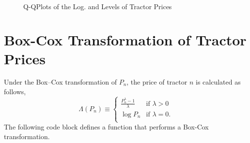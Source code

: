 \documentclass[11pt]{book}
\begin{document}
\begin{figure}[!ht]
\hfill
{}

\caption{Q-QPlots of the Log. and Levels of Tractor Prices}
\label{fig:qq_prices}
\end{figure}





\pagebreak
\section{Box-Cox Transformation of Tractor Prices}

Under the Box--Cox transformation of $P_n$, the price of tractor $n$
is calculated as follows,
$$\Lambda(P_n)\equiv
  \begin{cases}
	\frac{P_n^\lambda-1}{\lambda}	& \textrm{if } \lambda > 0 \\
           \log P_n                     			& \textrm{if } \lambda = 0.\\
  \end{cases}
$$
The following code block defines a function that performs a
Box-Cox transformation.
\end{document}
